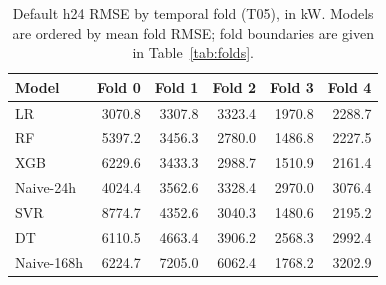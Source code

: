 \begin{table}[H]\centering\small
\caption{Default h24 RMSE by temporal fold (T05), in kW. Models are ordered by mean fold RMSE; fold boundaries are given in Table~\ref{tab:folds}.}\label{tab:cv_folds}
\setlength{\tabcolsep}{4pt}
\begin{tabular}{lrrrrr}
\toprule
Model & Fold 0 & Fold 1 & Fold 2 & Fold 3 & Fold 4 \\
\midrule
LR & \num{3070.8} & \num{3307.8} & \num{3323.4} & \num{1970.8} & \num{2288.7} \\
RF & \num{5397.2} & \num{3456.3} & \num{2780.0} & \num{1486.8} & \num{2227.5} \\
XGB & \num{6229.6} & \num{3433.3} & \num{2988.7} & \num{1510.9} & \num{2161.4} \\
Naive-24h & \num{4024.4} & \num{3562.6} & \num{3328.4} & \num{2970.0} & \num{3076.4} \\
SVR & \num{8774.7} & \num{4352.6} & \num{3040.3} & \num{1480.6} & \num{2195.2} \\
DT & \num{6110.5} & \num{4663.4} & \num{3906.2} & \num{2568.3} & \num{2992.4} \\
Naive-168h & \num{6224.7} & \num{7205.0} & \num{6062.4} & \num{1768.2} & \num{3202.9} \\
\bottomrule\end{tabular}
\end{table}
